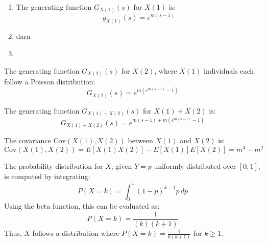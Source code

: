 \begin{enumerate}[label=(\alph*)]
\solution
\begin{enumerate}
    \item The generating function \( G_{X(1)}(s) \) for \( X(1) \) is:
    \[ g_{X(1)}(s) = e^{m(s-1)} \]

    \item darn
    \item 
\end{enumerate}

The generating function \( G_{X(2)}(s) \) for \( X(2) \), where \( X(1) \) individuals each follow a Poisson distribution:
\[ G_{X(2)}(s) = e^{m(e^{m(s-1)}-1)} \]

The generating function \( G_{X(1) + X(2)}(s) \) for \( X(1) + X(2) \) is:
\[ G_{X(1)+X(2)}(s) = e^{m(s-1) + m(e^{m(s-1)}-1)} \]

The covariance \( \text{Cov}(X(1), X(2)) \) between \( X(1) \) and \( X(2) \) is:
\[ \text{Cov}(X(1), X(2)) = E[X(1)X(2)] - E[X(1)]E[X(2)] = m^3 - m^2 \]
\end{enumerate}


\solution

The probability distribution for \( X \), given \( Y = p \) uniformly distributed over \([0,1]\), is computed by integrating:
\[ P(X = k) = \int_0^1 (1-p)^{k-1} p \, dp \]
Using the beta function, this can be evaluated as:
\[ P(X = k) = \frac{1}{(k)(k+1)} \]
Thus, \( X \) follows a distribution where \( P(X = k) = \frac{1}{k(k+1)} \) for \( k \geq 1 \).

